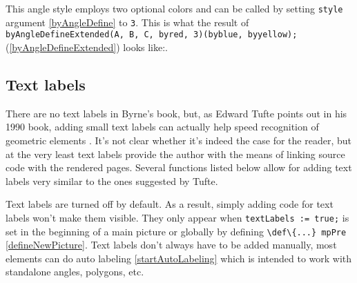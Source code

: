 This angle style employs two optional colors and can be called by setting \texttt{style} argument \ref{byAngleDefine} to \texttt{3}. This is what the result of \texttt{byAngleDefineExtended(A, B, C, byred, 3)(byblue, byyellow);} (\ref{byAngleDefineExtended}) looks like:.






\subsection{Text labels}\label{textlabels}

There are no text labels in Byrne's book, but, as Edward Tufte points out in his 1990 book, adding small text labels can actually help speed recognition of geometric elements \cite{Tufte90}. It's not clear whether it's indeed the case for the reader, but at the very least text labels provide the author with the means of linking source code with the rendered pages. Several functions listed below allow for adding text labels very similar to the ones suggested by Tufte.

Text labels are turned off by default. As a result, simply adding code for text labels won't make them visible. They only appear when \texttt{textLabels := true;} is set in the beginning of a main picture or globally by defining \texttt{\textbackslash def\textbackslash\{...\} mpPre} \ref{defineNewPicture}. Text labels don't always have to be added manually, most elements can do auto labeling \ref{startAutoLabeling} which is intended to work with standalone angles, polygons, etc. 

